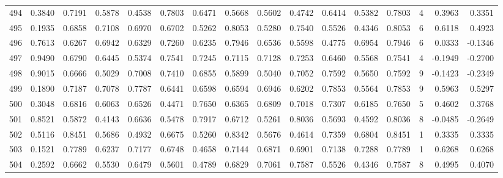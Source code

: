 \begin{tabular}{lrrrrrrrrrrrrrrr}
494 &      0.3840 &  0.7191 &  0.5878 &  0.4538 &  0.7803 &  0.6471 &  0.5668 &  0.5602 &  0.4742 &  0.6414 &   0.5382 &     0.7803 &      4 &                    0.3963 &                     0.3351 \\
495 &      0.1935 &  0.6858 &  0.7108 &  0.6970 &  0.6702 &  0.5262 &  0.8053 &  0.5280 &  0.7540 &  0.5526 &   0.4346 &     0.8053 &      6 &                    0.6118 &                     0.4923 \\
496 &      0.7613 &  0.6267 &  0.6942 &  0.6329 &  0.7260 &  0.6235 &  0.7946 &  0.6536 &  0.5598 &  0.4775 &   0.6954 &     0.7946 &      6 &                    0.0333 &                    -0.1346 \\
497 &      0.9490 &  0.6790 &  0.6445 &  0.5374 &  0.7541 &  0.7245 &  0.7115 &  0.7128 &  0.7253 &  0.6460 &   0.5568 &     0.7541 &      4 &                   -0.1949 &                    -0.2700 \\
498 &      0.9015 &  0.6666 &  0.5029 &  0.7008 &  0.7410 &  0.6855 &  0.5899 &  0.5040 &  0.7052 &  0.7592 &   0.5650 &     0.7592 &      9 &                   -0.1423 &                    -0.2349 \\
499 &      0.1890 &  0.7187 &  0.7078 &  0.7787 &  0.6441 &  0.6598 &  0.6594 &  0.6946 &  0.6202 &  0.7853 &   0.5564 &     0.7853 &      9 &                    0.5963 &                     0.5297 \\
500 &      0.3048 &  0.6816 &  0.6063 &  0.6526 &  0.4471 &  0.7650 &  0.6365 &  0.6809 &  0.7018 &  0.7307 &   0.6185 &     0.7650 &      5 &                    0.4602 &                     0.3768 \\
501 &      0.8521 &  0.5872 &  0.4143 &  0.6636 &  0.5478 &  0.7917 &  0.6712 &  0.5261 &  0.8036 &  0.5693 &   0.4592 &     0.8036 &      8 &                   -0.0485 &                    -0.2649 \\
502 &      0.5116 &  0.8451 &  0.5686 &  0.4932 &  0.6675 &  0.5260 &  0.8342 &  0.5676 &  0.4614 &  0.7359 &   0.6804 &     0.8451 &      1 &                    0.3335 &                     0.3335 \\
503 &      0.1521 &  0.7789 &  0.6237 &  0.7177 &  0.6748 &  0.4658 &  0.7144 &  0.6871 &  0.6901 &  0.7138 &   0.7288 &     0.7789 &      1 &                    0.6268 &                     0.6268 \\
504 &      0.2592 &  0.6662 &  0.5530 &  0.6479 &  0.5601 &  0.4789 &  0.6829 &  0.7061 &  0.7587 &  0.5526 &   0.4346 &     0.7587 &      8 &                    0.4995 &                     0.4070 \\

\end{tabular}
